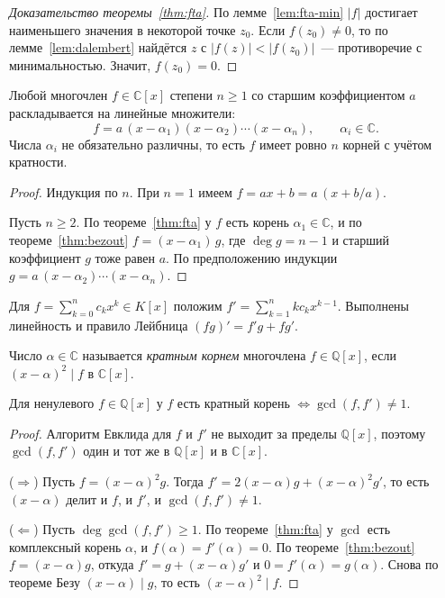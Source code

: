 \documentclass[12pt]{article}
\begin{document}
	\begin{proof}[Доказательство теоремы~\ref{thm:fta}]
		По лемме~\ref{lem:fta-min} $|f|$ достигает наименьшего значения в некоторой точке $z_0$. Если $f(z_0) \ne 0$, то по лемме~\ref{lem:dalembert} найдётся $z$ с $|f(z)| < |f(z_0)|$~--- противоречие с минимальностью. Значит, $f(z_0) = 0$.
	\end{proof}

	\begin{corollary}\label{cor:fta-factor}
		Любой многочлен $f \in \mathbb{C}[x]$ степени $n \geqslant 1$ со старшим коэффициентом $a$ раскладывается на линейные множители:
		\[
			f = a\,(x - \alpha_1)(x - \alpha_2) \cdots (x - \alpha_n), \qquad \alpha_i \in \mathbb{C}.
		\]
		Числа $\alpha_i$ не обязательно различны, то есть $f$ имеет ровно $n$ корней с учётом кратности.
	\end{corollary}

	\begin{proof}
		Индукция по $n$. При $n = 1$ имеем $f = a x + b = a\,(x + b/a)$.

		Пусть $n \geqslant 2$. По теореме~\ref{thm:fta} у $f$ есть корень $\alpha_1 \in \mathbb{C}$, и по теореме~\ref{thm:bezout} $f = (x - \alpha_1)\,g$, где $\deg g = n - 1$ и старший коэффициент $g$ тоже равен $a$. По предположению индукции $g = a\,(x - \alpha_2) \cdots (x - \alpha_n)$.
	\end{proof}

	\begin{definition}[Производная]\label{def:derivative}
		Для $f = \sum_{k=0}^{n} c_k x^k \in K[x]$ положим $f' = \sum_{k=1}^{n} k c_k x^{k-1}$. Выполнены линейность и правило Лейбница $(fg)' = f'g + fg'$.
	\end{definition}

	\begin{definition}\label{def:multiple-root}
		Число $\alpha \in \mathbb{C}$ называется \emph{кратным корнем} многочлена $f \in \mathbb{Q}[x]$, если $(x - \alpha)^2 \mid f$ в $\mathbb{C}[x]$.
	\end{definition}

	\begin{statement}\label{st:multiple-roots}
		Для ненулевого $f \in \mathbb{Q}[x]$ у $f$ есть кратный корень $\iff \gcd(f, f') \ne 1$.
	\end{statement}

	\begin{proof}
		Алгоритм Евклида для $f$ и $f'$ не выходит за пределы $\mathbb{Q}[x]$, поэтому $\gcd(f, f')$ один и тот же в $\mathbb{Q}[x]$ и в $\mathbb{C}[x]$.

		($\Rightarrow$) Пусть $f = (x - \alpha)^2 g$. Тогда $f' = 2(x - \alpha)g + (x - \alpha)^2 g'$, то есть $(x - \alpha)$ делит и $f$, и $f'$, и $\gcd(f, f') \ne 1$.

				($\Leftarrow$) Пусть $\deg \gcd(f, f') \geqslant 1$. По теореме~\ref{thm:fta} у $\gcd$ есть комплексный корень $\alpha$, и $f(\alpha) = f'(\alpha) = 0$. По теореме~\ref{thm:bezout} $f = (x - \alpha)g$, откуда $f' = g + (x - \alpha)g'$ и $0 = f'(\alpha) = g(\alpha)$. Снова по теореме Безу $(x - \alpha) \mid g$, то есть $(x - \alpha)^2 \mid f$.
	\end{proof}
    
\end{document}
